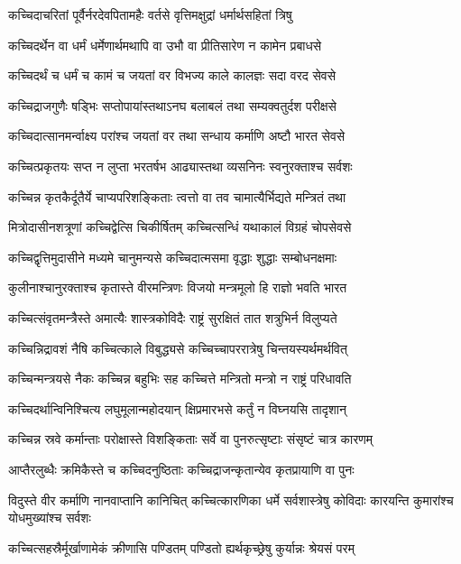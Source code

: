 \twolineshloka
{कच्चिदाचरितां पूर्वैर्नरदेवपितामहैः}
{वर्तसे वृत्तिमक्षुद्रां धर्मार्थसहितां त्रिषु}


\twolineshloka
{कच्चिदर्थेन वा धर्मं धर्मेणार्थमथापि वा}
{उभौ वा प्रीतिसारेण न कामेन प्रबाधसे}


\twolineshloka
{कच्चिदर्थं च धर्मं च कामं च जयतां वर}
{विभज्य काले कालज्ञः सदा वरद सेवसे}


\twolineshloka
{कच्चिद्राजगुणैः षड्भिः सप्तोपायांस्तथाऽनघ}
{बलाबलं तथा सम्यक्वतुर्दश परीक्षसे}


\twolineshloka
{कच्चिदात्सानमर्न्वाक्ष्य परांश्च जयतां वर}
{तथा सन्धाय कर्माणि अष्टौ भारत सेवसे}


\twolineshloka
{कच्चित्प्रकृतयः सप्त न लुप्ता भरतर्षभ}
{आढ्यास्तथा व्यसनिनः स्वनुरक्ताश्च सर्वशः}


\twolineshloka
{कच्चिन्न कृतकैर्दूतैर्ये चाप्यपरिशङ्किताः}
{त्वत्तो वा तव चामात्यैर्भिद्यते मन्त्रितं तथा}


\twolineshloka
{मित्रोदासीनशत्रूणां कच्चिद्वेत्सि चिकीर्षितम्}
{कच्चित्सन्धिं यथाकालं विग्रहं चोपसेवसे}


\twolineshloka
{कच्चिद्वृत्तिमुदासीने मध्यमे चानुमन्यसे}
{कच्चिदात्मसमा वृद्धाः शुद्धाः सम्बोधनक्षमाः}


\twolineshloka
{कुलीनाश्चानुरक्ताश्च कृतास्ते वीरमन्त्रिणः}
{विजयो मन्त्रमूलो हि राज्ञो भवति भारत}


\twolineshloka
{कच्चित्संवृतमन्त्रैस्ते अमात्यैः शास्त्रकोविदैः}
{राष्ट्रं सुरक्षितं तात शत्रुभिर्न विलुप्यते}


\twolineshloka
{कच्चिन्निद्रावशं नैषि कच्चित्काले विबुद्ध्यसे}
{कच्चिच्चापररात्रेषु चिन्तयस्यर्थमर्थवित्}


\twolineshloka
{कच्चिन्मन्त्रयसे नैकः कच्चिन्न बहुभिः सह}
{कच्चित्ते मन्त्रितो मन्त्रो न राष्ट्रं परिधावति}


\twolineshloka
{कच्चिदर्थान्विनिश्चित्य लघुमूलान्महोदयान्}
{क्षिप्रमारभसे कर्तुं न विघ्नयसि तादृशान्}


\twolineshloka
{कच्चिन्न स्रवे कर्मान्ताः परोक्षास्ते विशङ्किताः}
{सर्वे वा पुनरुत्सृष्टाः संसृष्टं चात्र कारणम्}


\twolineshloka
{आप्तैरलुब्धैः क्रमिकैस्ते च कच्चिदनुष्ठिताः}
{कच्चिद्राजन्कृतान्येव कृतप्रायाणि वा पुनः}


\threelineshloka
{विदुस्ते वीर कर्माणि नानवाप्तानि कानिचित्}
{कच्चित्कारणिका धर्मे सर्वशास्त्रेषु कोविदाः}
{कारयन्ति कुमारांश्च योधमुख्यांश्च सर्वशः}


\twolineshloka
{कच्चित्सहस्रैर्मूर्खाणामेकं क्रीणासि पण्डितम्}
{पण्डितो ह्यर्थकृच्छ्रेषु कुर्यान्नः श्रेयसं परम्}


